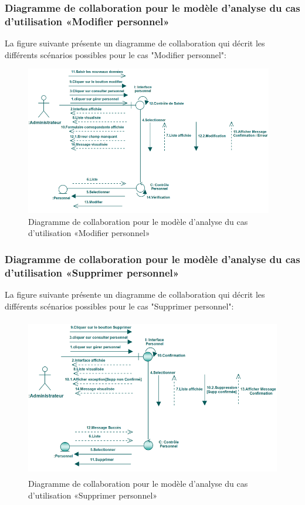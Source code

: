 \documentclass[12 pt]{report}
\begin{document}
\subsubsection{Diagramme de collaboration pour le modèle d’analyse du cas d'utilisation                                       «Modifier personnel»}
La figure suivante présente un diagramme de collaboration qui décrit les différents
scénarios possibles pour le cas "Modifier personnel":
\begin{figure}[h]
 \begin{center}
\includegraphics[width= 14 cm ,height=  6.5cm]{colla_adm_modifierpersonnel.PNG}
\caption{Diagramme de collaboration pour le modèle d’analyse du cas d'utilisation                                       «Modifier personnel»}

\end{center}
\end{figure}
\subsubsection{Diagramme de collaboration pour le modèle d’analyse du cas d'utilisation                                       «Supprimer personnel»}
La figure suivante présente un diagramme de collaboration qui décrit les différents
scénarios possibles pour le cas "Supprimer personnel":
\begin{figure}[h]
 \begin{center}
\includegraphics[width= 12 cm ,height=  7cm]{colla_adm_supprimerpersonnel.PNG}
\caption{Diagramme de collaboration pour le modèle d’analyse du cas d'utilisation                                       «Supprimer personnel»}

\end{center}
\end{figure}
\end{document}
